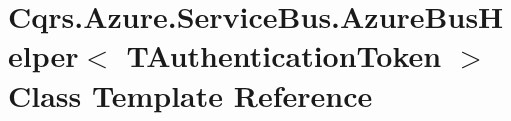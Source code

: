\hypertarget{classCqrs_1_1Azure_1_1ServiceBus_1_1AzureBusHelper}{}\section{Cqrs.\+Azure.\+Service\+Bus.\+Azure\+Bus\+Helper$<$ T\+Authentication\+Token $>$ Class Template Reference}
\label{classCqrs_1_1Azure_1_1ServiceBus_1_1AzureBusHelper}
